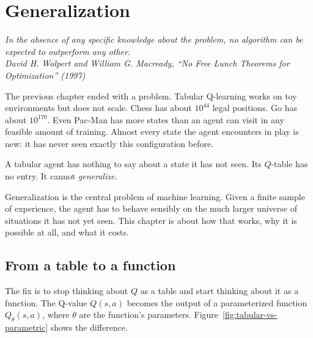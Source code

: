 \chapter{Generalization}

\vspace{1em}
\hfill
\begin{minipage}[c]{0.55\textwidth}
\raggedleft
\small\itshape
In the absence of any specific knowledge about the problem, no algorithm can be expected to outperform any other.\\[0.5em]
\upshape\footnotesize David H. Wolpert and William G. Macready, ``No Free Lunch Theorems for Optimization'' (1997)
\end{minipage}%
\hspace{0.5em}
\begin{minipage}[c]{0.12\textwidth}
\end{minipage}
\vspace{1.5em}

\noindent The previous chapter ended with a problem. Tabular Q-learning works on toy environments but does not scale. Chess has about $10^{44}$ legal positions. Go has about $10^{170}$. Even Pac-Man has more states than an agent can visit in any feasible amount of training. Almost every state the agent encounters in play is new: it has never seen exactly this configuration before.

A tabular agent has nothing to say about a state it has not seen. Its $Q$-table has no entry. It cannot \emph{generalize}.

Generalization is the central problem of machine learning. Given a finite sample of experience, the agent has to behave sensibly on the much larger universe of situations it has not yet seen. This chapter is about how that works, why it is possible at all, and what it costs.

\section*{From a table to a function}

The fix is to stop thinking about $Q$ as a table and start thinking about it as a function. The Q-value $Q(s, a)$ becomes the output of a parameterized function $Q_\theta(s, a)$, where $\theta$ are the function's parameters. Figure~\ref{fig:tabular-vs-parametric} shows the difference.

